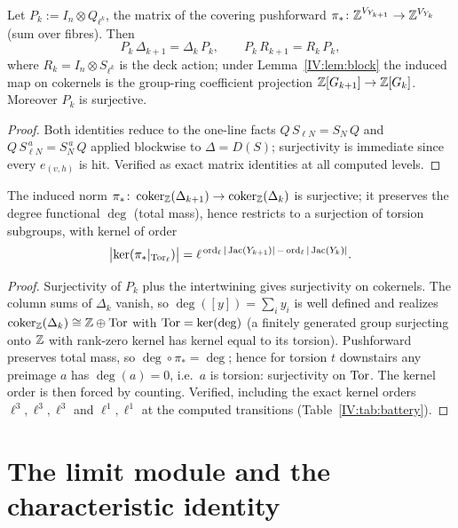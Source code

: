 \begin{lemma}\label{IV:lem:norm}
Let $P_k:=I_n\otimes Q_{\ell^k}$, the matrix of the covering pushforward
$\pi_*\colon\mathbb{Z}^{V_{Y_{k+1}}}\to\mathbb{Z}^{V_{Y_k}}$ (sum over fibres). Then
\[
P_k\,\Delta_{k+1}=\Delta_k\,P_k,
\qquad
P_k\,R_{k+1}=R_k\,P_k,
\]
where $R_k=I_n\otimes S_{\ell^k}$ is the deck action; under
Lemma~\ref{IV:lem:block} the induced map on cokernels is the group-ring coefficient
projection $\mathbb{Z}[G_{k+1}]\to\mathbb{Z}[G_k]$. Moreover $P_k$ is surjective.
\end{lemma}

\begin{proof}
Both identities reduce to the one-line facts $Q\,S_{\ell N}=S_N\,Q$ and
$Q\,S_{\ell N}^{\,a}=S_N^{\,a}\,Q$ applied blockwise to $\Delta=D(S)$; surjectivity
is immediate since every $e_{(v,h)}$ is hit. Verified as exact matrix identities at
all computed levels.
\end{proof}

\begin{lemma}\label{IV:lem:torsurj}
The induced norm
$\pi_*\colon\operatorname{coker}_{\mathbb{Z}}(\Delta_{k+1})\to\operatorname{coker}_{\mathbb{Z}}(\Delta_k)$ is
surjective; it preserves the degree functional $\deg$ (total mass), hence restricts
to a surjection of torsion subgroups, with kernel of order
\[
\bigl|\ker(\pi_*|_{\operatorname{Tor}_\ell})\bigr|
=\ell^{\,\operatorname{ord}_\ell|\operatorname{Jac}(Y_{k+1})|\,-\,\operatorname{ord}_\ell|\operatorname{Jac}(Y_k)|}.
\]
\end{lemma}

\begin{proof}
Surjectivity of $P_k$ plus the intertwining gives surjectivity on cokernels. The
column sums of $\Delta_k$ vanish, so $\deg([y])=\sum_iy_i$ is well defined and
realizes $\operatorname{coker}_{\mathbb{Z}}(\Delta_k)\cong\mathbb{Z}\oplus\operatorname{Tor}$ with $\operatorname{Tor}=\ker(\deg)$ (a finitely
generated group surjecting onto $\mathbb{Z}$ with rank-zero kernel has kernel equal to its
torsion). Pushforward preserves total mass, so $\deg\circ\pi_*=\deg$; hence for
torsion $t$ downstairs any preimage $a$ has $\deg(a)=0$, i.e.\ $a$ is torsion:
surjectivity on $\operatorname{Tor}$. The kernel order is then forced by counting. Verified,
including the exact kernel orders $\ell^{3},\ell^{3},\ell^{3}$ and
$\ell^{1},\ell^{1}$ at the computed transitions (Table~\ref{IV:tab:battery}).
\end{proof}

\section{The limit module and the characteristic identity}\label{IV:sec:limit}

